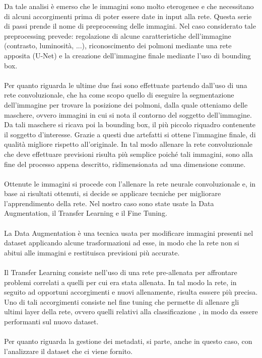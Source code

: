 Da tale analisi è emerso che le immagini sono molto eterogenee e che necessitano di alcuni accorgimenti prima di poter essere 
date in input alla rete. Questa serie di passi prende il nome di preprocessing delle immagini.
Nel caso considerato tale preprocessing prevede: regolazione di alcune caratteristiche dell'immagine (contrasto, luminosità, ...),
riconoscimento dei polmoni mediante una rete apposita (U-Net) e la creazione dell'immagine finale mediante l'uso di bounding box.
\\\\
Per quanto riguarda le ultime due fasi sono effettuate partendo dall'uso di una rete convoluzionale, che ha come scopo 
quello di eseguire la segmentazione dell'immagine per trovare la posizione dei polmoni, dalla quale otteniamo delle maschere, ovvero 
immagini in cui si nota il contorno del soggetto dell'immagine. Da tali maschere si ricava poi la bounding box, il più piccolo
riquadro contenente il soggetto d'interesse.
Grazie a questi due artefatti si ottene l'immagine finale, di qualità migliore rispetto all'originale.
In tal modo allenare la rete convoluzionale che deve effettuare previsioni risulta più semplice poiché tali immagini, sono alla fine del
processo appena descritto, ridimensionata ad una dimensione comune. 
\\\\
Ottenute le immagini si procede con l'allenare la rete neurale convoluzionale e, in base ai risultati ottenuti, si decide se applicare 
tecniche per migliorare l'apprendimento della rete. Nel nostro caso sono state usate la Data Augmentation, il Transfer Learning e il Fine Tuning.
\\\\
La Data Augmentation è una tecnica usata per modificare immagini presenti nel dataset applicando alcune trasformazioni ad esse, in modo 
che la rete non si abitui alle immagini e restituisca previsioni più accurate.
\\\\
Il Transfer Learning consiste nell'uso di una rete pre-allenata per affrontare problemi correlati a quelli per cui era stata allenata.
In tal modo la rete, in seguito ad opportuni accorgimenti e nuovi allenamente, risulta esssere più precisa.
Uno di tali accorgimenti consiste nel fine tuning che permette di allenare gli ultimi layer della rete, ovvero quelli relativi alla classificazione
, in modo da essere performanti sul nuovo dataset.
\\\\
Per quanto riguarda la gestione dei metadati, si parte, anche in questo caso, con l'analizzare il dataset che ci viene fornito.
